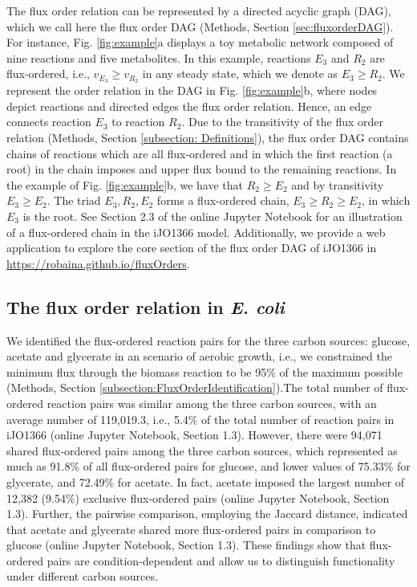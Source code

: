 \documentclass[12pt]{article}
\begin{document}
The flux order relation can be represented by a directed acyclic graph (DAG), which we call here the flux order DAG (Methods, Section \ref{sec:fluxorderDAG}). For instance, Fig. \ref{fig:example}a displays a toy metabolic network composed of nine reactions and five metabolites. In this example, reactions $E_3$ and $R_2$ are flux-ordered, i.e., $v_{E_3} \geq v_{R_2}$ in any steady state, which we denote as $E_3 \geq R_2$. We represent the order relation in the DAG in Fig. \ref{fig:example}b, where nodes depict reactions and directed edges the flux order relation. Hence, an edge connects reaction $E_3$ to reaction $R_2$. Due to the transitivity of the flux order relation (Methods, Section \ref{subsection: Definitions}), the flux order DAG contains chains of reactions which are all flux-ordered and in which the first reaction (a root) in the chain imposes and upper flux bound to the remaining reactions. In the example of Fig. \ref{fig:example}b, we have that $R_2 \geq E_2$ and by transitivity $E_3 \geq E_2$. The triad $E_3, R_2, E_2$ forms a flux-ordered chain, $E_3 \geq R_2 \geq E_2$, in which $E_3$ is the root. See Section 2.3 of the online Jupyter Notebook for an illustration of a flux-ordered chain in the iJO1366 model. Additionally, we provide a web application to explore the core section of the flux order DAG of iJO1366 in \url{https://robaina.github.io/fluxOrders}.

\subsection{The flux order relation in \emph{E. coli}}
\label{subsection: FluxOrderRelation}
We identified the flux-ordered reaction pairs for the three carbon sources: glucose, acetate and glycerate in an scenario of aerobic growth, i.e., we constrained the minimum flux through the biomass reaction to be 95\% of the maximum possible (Methods, Section \ref{subsection:FluxOrderIdentification}).The total number of flux-ordered reaction pairs was similar among the three carbon sources, with an average number of 119,019.3, i.e., 5.4\% of the total number of reaction pairs in iJO1366 (online Jupyter Notebook, Section 1.3). However, there were 94,071 shared flux-ordered pairs among the three carbon sources, which represented as much as 91.8\% of all flux-ordered pairs for glucose, and lower values of 75.33\% for glycerate, and 72.49\% for acetate. In fact, acetate imposed the largest number of 12,382 (9.54\%) exclusive flux-ordered pairs (online Jupyter Notebook, Section 1.3). Further, the pairwise comparison, employing the Jaccard distance, indicated that acetate and glycerate shared more flux-ordered pairs in comparison to glucose (online Jupyter Notebook, Section 1.3). These findings show that flux-ordered pairs are condition-dependent and allow us to distinguish functionality under different carbon sources.
\end{document}
